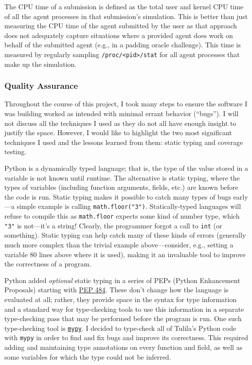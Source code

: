 \documentclass[12pt]{article}
\begin{document}
The CPU time of a submission is defined as the total user and kernel CPU time of all the agent processes in that submission's simulation. This is better than just measuring the CPU time of the agent submitted by the user as that approach does not adequately capture situations where a provided agent does work on behalf of the submitted agent (e.g., in a padding oracle challenge). This time is measured by regularly sampling \texttt{/proc/<pid>/stat} for all agent processes that make up the simulation.

\subsubsection{Quality Assurance}

Throughout the course of this project, I took many steps to ensure the software I was building worked as intended with minimal errant behavior (``bugs''). I will not discuss all the techniques I used as they do not all have enough insight to justify the space. However, I would like to highlight the two most significant techniques I used and the lessons learned from them: static typing and coverage testing.

Python is a dynamically typed language; that is, the type of the value stored in a variable is not known until runtime. The alternative is static typing, where the types of variables (including function arguments, fields, etc.) are known before the code is run. Static typing makes it possible to catch many types of bugs early---a simple example is calling \texttt{math.floor("3")}. Statically-typed languages will refuse to compile this as \texttt{math.floor} expects some kind of number type, which \texttt{"3"} is not---it's a string! Clearly, the programmer forgot a call to \texttt{int} (or something). Static typing can help catch many of these kinds of errors (generally much more complex than the trivial example above---consider, e.g., setting a variable 80 lines above where it is used), making it an invaluable tool to improve the correctness of a program.


Python added \textit{optional} static typing in a series of PEPs (Python Enhancement Proposals) starting with \href{https://peps.python.org/pep-0484/}{PEP 484}. These don't change how the language is evaluated at all; rather, they provide space in the syntax for type information and a standard way for type-checking tools to use this information in a separate type-checking pass that may be performed before the program is run. One such type-checking tool is \href{https://mypy-lang.org/}{\texttt{mypy}}. I decided to type-check all of Tulila's Python code with \texttt{mypy} in order to find and fix bugs and improve its correctness. This required adding and maintaining type annotations on every function and field, as well as some variables for which the type could not be inferred.
\end{document}

